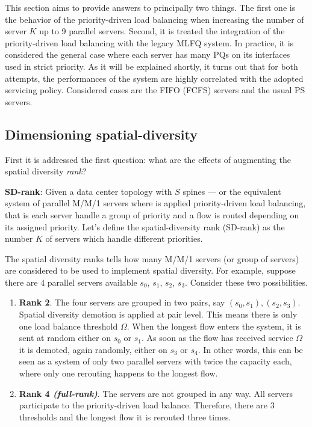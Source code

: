 This section aims to provide answers to principally two things. The first one is the behavior of the priority-driven load balancing when increasing the number of server $K$ up to 9 parallel servers. Second, it is treated the integration of the priority-driven load balancing with the legacy MLFQ system. In practice, it is considered the general case where each server has many PQs on its interfaces used in strict priority. As it will be explained shortly, it turns out that for both attempts, the performances of the system are highly correlated with the adopted servicing policy. Considered cases are the FIFO (FCFS) servers and the usual PS servers. 

\subsection{Dimensioning spatial-diversity}
\label{sec:dimensioning-spatial}
First it is addressed the first question: what are the effects of augmenting the spatial diversity \emph{rank}? 
\begin{tcolorbox}
	\textbf{SD-rank}: Given a data center topology with $S$ spines --- or the equivalent system of parallel M/M/1 servers where is applied priority-driven load balancing, that is each server handle a group of priority and a flow is routed depending on its assigned priority. Let's define the spatial-diversity rank (SD-rank) as the number $K$ of servers which handle different priorities. 
\end{tcolorbox}
The spatial diversity ranks tells how many M/M/1 servers (or group of servers) are considered to be used to implement spatial diversity. For example, suppose there are 4 parallel servers available $s_0$, $s_1$, $s_2$, $s_3$. Consider these two possibilities. 
\begin{enumerate}
	\item \textbf{Rank 2}. The four servers are grouped in two pairs, say $(s_0, s_1), (s_2,s_3)$. Spatial diversity demotion is applied at pair level. This means there is only one load balance threshold $\Omega$. When the longest flow enters the system, it is sent at random either on $s_0$ or $s_1$. As soon as the flow has received service $\Omega$ it is demoted, again randomly, either on $s_3$ or $s_4$. In other words, this can be seen as a system of only two parallel servers with twice the capacity each, where only one rerouting happens to the longest flow. 
	\item \textbf{Rank 4 \textit{(full-rank)}}. The servers are not grouped in any way. All servers participate to the priority-driven load balance. Therefore, there are 3 thresholds and the longest flow it is rerouted three times.
\end{enumerate}
